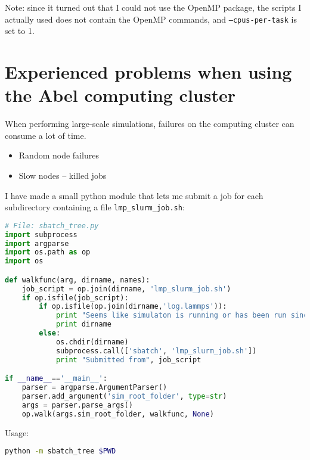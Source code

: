 Note: since it turned out that I could not use the OpenMP package, the scripts I actually used does not contain the OpenMP commands, and {\tt --cpus-per-task} is set to 1.

\section{Experienced problems when using the Abel computing cluster}
When performing large-scale simulations, failures on the computing cluster can consume a lot of time.
\begin{itemize}
\item Random node failures
\item Slow nodes -- killed jobs
\end{itemize}


I have made a small python module that lets me submit a job for each subdirectory containing a file {\tt lmp\_slurm\_job.sh}:

\begin{lstlisting}[language=Python]
# File: sbatch_tree.py
import subprocess
import argparse
import os.path as op
import os

def walkfunc(arg, dirname, names):
	job_script = op.join(dirname, 'lmp_slurm_job.sh')
	if op.isfile(job_script):
		if op.isfile(op.join(dirname,'log.lammps')):
			print "Seems like simulaton is running or has been run since there are output files in the folder"
			print dirname
		else:
			os.chdir(dirname)
			subprocess.call(['sbatch', 'lmp_slurm_job.sh'])
			print "Submitted from", job_script 

if __name__=='__main__':
	parser = argparse.ArgumentParser()
	parser.add_argument('sim_root_folder', type=str)
	args = parser.parse_args()
	op.walk(args.sim_root_folder, walkfunc, None)
\end{lstlisting}

Usage:
\begin{lstlisting}[language=Bash]
python -m sbatch_tree $PWD
\end{lstlisting}